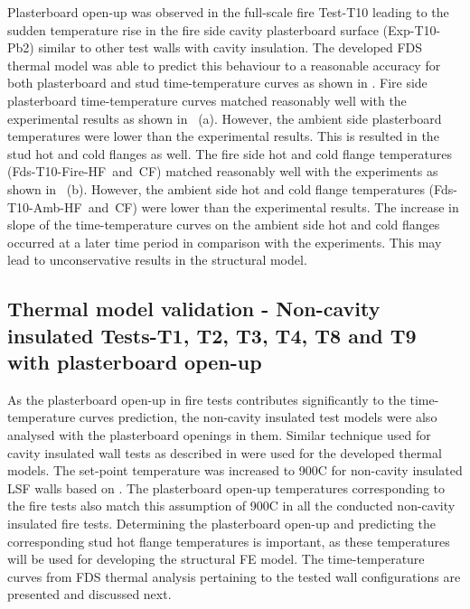 Plasterboard open-up was observed in the full-scale fire Test-T10 leading to the sudden temperature rise in the fire side cavity plasterboard surface (Exp-T10-Pb2) similar to other test walls with cavity insulation. The developed FDS thermal model was able to predict this behaviour to a reasonable accuracy for both plasterboard and stud time-temperature curves as shown in . Fire side plasterboard time-temperature curves matched reasonably well with the experimental results as shown in ~(a). However, the ambient side plasterboard temperatures were lower than the experimental results. This is resulted in the stud hot and cold flanges as well. The fire side hot and cold flange temperatures (Fds-T10-Fire-HF~and~CF) matched reasonably well with the experiments as shown in ~(b). However, the ambient side hot and cold flange temperatures (Fds-T10-Amb-HF~and~CF) were lower than the experimental results. The increase in slope of the time-temperature curves on the ambient side hot and cold flanges occurred at a later time period in comparison with the experiments. This may lead to unconservative results in the structural model. 

\subsection{Thermal model validation - Non-cavity insulated Tests-T1, T2, T3, T4, T8 and T9 with plasterboard open-up} \label{sec:thermal-model-non-cav}

As the plasterboard open-up in fire tests contributes significantly to the time-temperature curves prediction, the non-cavity insulated test models were also analysed with the plasterboard openings in them. Similar technique used for cavity insulated wall tests as described in  were used for the developed thermal models. The set-point temperature was increased to 900\degree C for non-cavity insulated LSF walls based on \citet{Sultan2015}. The plasterboard open-up temperatures corresponding to the fire tests also match this assumption of 900\degree C in all the conducted non-cavity insulated fire tests. Determining the plasterboard open-up and predicting the corresponding stud hot flange temperatures is important, as these temperatures will be used for developing the structural FE model. The time-temperature curves from FDS thermal analysis pertaining to the tested wall configurations are presented and discussed next.

